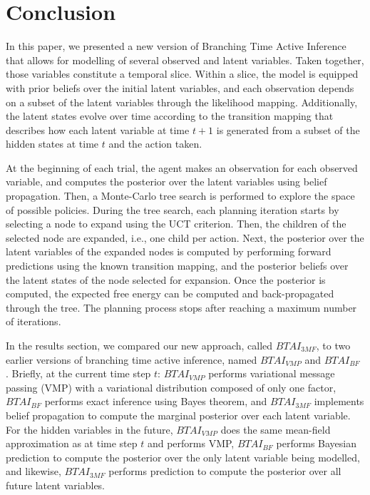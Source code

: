 \documentclass[twoside,11pt]{article}
\begin{document}
\section{Conclusion} \label{sec:conclusion}

In this paper, we presented a new version of Branching Time Active Inference that allows for modelling of several observed and latent variables. Taken together, those variables constitute a temporal slice. Within a slice, the model is equipped with prior beliefs over the initial latent variables, and each observation depends on a subset of the latent variables through the likelihood mapping. Additionally, the latent states evolve over time according to the transition mapping that describes how each latent variable at time $t+1$ is generated from a subset of the hidden states at time $t$ and the action taken.

At the beginning of each trial, the agent makes an observation for each observed variable, and computes the posterior over the latent variables using belief propagation. Then, a Monte-Carlo tree search is performed to explore the space of possible policies. During the tree search, each planning iteration starts by selecting a node to expand using the UCT criterion. Then, the children of the selected node are expanded, i.e., one child per action. Next, the posterior over the latent variables of the expanded nodes is computed by performing forward predictions using the known transition mapping, and the posterior beliefs over the latent states of the node selected for expansion. Once the posterior is computed, the expected free energy can be computed and back-propagated through the tree. The planning process stops after reaching a maximum number of iterations.

In the results section, we compared our new approach, called $BTAI_{3MF}$, to two earlier versions of branching time active inference, named $BTAI_{VMP}$ \citep{AITS_THEORY,AITS_PRACTICE} and $BTAI_{BF}$ \citep{BTAI_BF}. Briefly, at the current time step $t$: $BTAI_{VMP}$ performs variational message passing (VMP) with a variational distribution composed of only one factor, $BTAI_{BF}$ performs exact inference using Bayes theorem, and $BTAI_{3MF}$ implements belief propagation to compute the marginal posterior over each latent variable. For the hidden variables in the future, $BTAI_{VMP}$ does the same mean-field approximation as at time step $t$ and performs VMP, $BTAI_{BF}$ performs Bayesian prediction to compute the posterior over the only latent variable being modelled, and likewise, $BTAI_{3MF}$ performs prediction to compute the posterior over all future latent variables.
\end{document}
